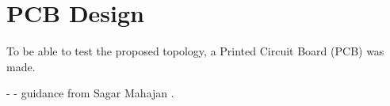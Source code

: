 \section{PCB Design}\label{ch:PCB}

To be able to test the proposed topology,
a Printed Circuit Board (PCB) was made.


- 
- guidance from Sagar Mahajan .

